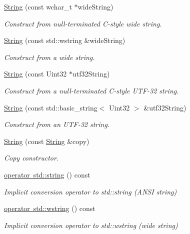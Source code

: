\begin{DoxyCompactItemize}
\mbox{\hyperlink{classsf_1_1_string_a5742d0a9b0c754f711820c2b5c40fa55}{String}} (const wchar\+\_\+t $\ast$wide\+String)
\begin{DoxyCompactList}\small\item\em Construct from null-\/terminated C-\/style wide string. \end{DoxyCompactList}\item 
\mbox{\hyperlink{classsf_1_1_string_a5e38151340af4f9a5f74ad24c0664074}{String}} (const std\+::wstring \&wide\+String)
\begin{DoxyCompactList}\small\item\em Construct from a wide string. \end{DoxyCompactList}\item 
\mbox{\hyperlink{classsf_1_1_string_aea3629adf19f9fe713d4946f6c75b214}{String}} (const Uint32 $\ast$utf32\+String)
\begin{DoxyCompactList}\small\item\em Construct from a null-\/terminated C-\/style U\+T\+F-\/32 string. \end{DoxyCompactList}\item 
\mbox{\hyperlink{classsf_1_1_string_a6eee86dbe75d16bbcc26e97416c2e1ca}{String}} (const std\+::basic\+\_\+string$<$ Uint32 $>$ \&utf32\+String)
\begin{DoxyCompactList}\small\item\em Construct from an U\+T\+F-\/32 string. \end{DoxyCompactList}\item 
\mbox{\hyperlink{classsf_1_1_string_af862594d3c4070d8ddbf08cf8dce4f59}{String}} (const \mbox{\hyperlink{classsf_1_1_string}{String}} \&copy)
\begin{DoxyCompactList}\small\item\em Copy constructor. \end{DoxyCompactList}\item 
\mbox{\hyperlink{classsf_1_1_string_a884816a0f688cfd48f9324c9741dc257}{operator std\+::string}} () const
\begin{DoxyCompactList}\small\item\em Implicit conversion operator to std\+::string (A\+N\+SI string) \end{DoxyCompactList}\item 
\mbox{\hyperlink{classsf_1_1_string_a6bd1444bebaca9bbf01ba203061f5076}{operator std\+::wstring}} () const
\begin{DoxyCompactList}\small\item\em Implicit conversion operator to std\+::wstring (wide string) \end{DoxyCompactList}\item 

\end{DoxyCompactItemize}

